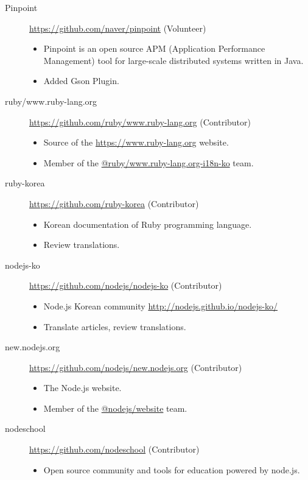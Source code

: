 \documentclass[a4paper,10pt]{article}
\begin{document}
\begin{description}
  \item[Pinpoint] \url{https://github.com/naver/pinpoint} (Volunteer)
    \begin{itemize}
      \item Pinpoint is an open source APM (Application Performance Management) tool for large-scale distributed systems written in Java.
      \item Added Gson Plugin.
    \end{itemize}
  \item[ruby/www.ruby-lang.org] \url{https://github.com/ruby/www.ruby-lang.org} (Contributor)
    \begin{itemize}
      \item Source of the \url{https://www.ruby-lang.org} website.
      \item Member of the \href{https://github.com/orgs/ruby/teams/www-ruby-lang-org-i18n-ko}{@ruby/www.ruby-lang.org-i18n-ko} team.
    \end{itemize}
  \item[ruby-korea] \url{https://github.com/ruby-korea} (Contributor)
    \begin{itemize}
      \item Korean documentation of Ruby programming language.
      \item Review translations.
    \end{itemize}
  \item[nodejs-ko] \url{https://github.com/nodejs/nodejs-ko} (Contributor)
    \begin{itemize}
      \item Node.js Korean community \url{http://nodejs.github.io/nodejs-ko/}
      \item Translate articles, review translations.
    \end{itemize}
  \item[new.nodejs.org] \url{https://github.com/nodejs/new.nodejs.org} (Contributor)
    \begin{itemize}
      \item The Node.js website.
      \item Member of the \href{https://github.com/orgs/nodejs/teams/website}{@nodejs/website} team.
    \end{itemize}
  \item[nodeschool] \url{https://github.com/nodeschool} (Contributor)
    \begin{itemize}
      \item Open source community and tools for education powered by node.js.

\end{itemize}
\end{description}
\end{document}
